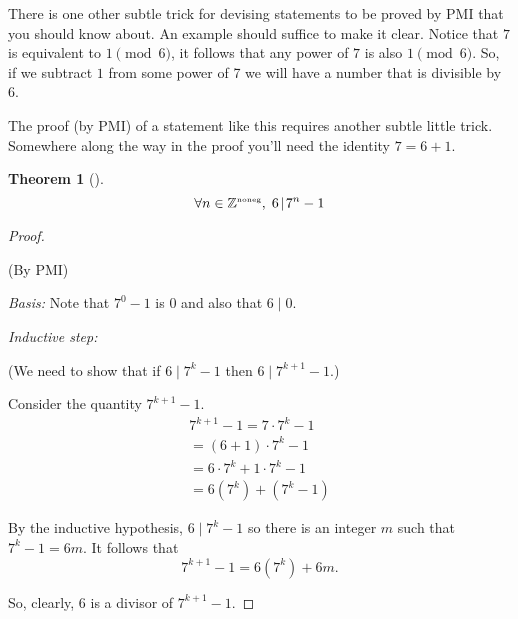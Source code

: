 \documentclass[10pt,]{book}
\theoremstyle{plain}
\newtheorem{theorem}{Theorem}[section]
\theoremstyle{definition}
\theoremstyle{definition}
\numberwithin{equation}{section}
\renewcommand{\Naturals}{{\mathbb Z}^{\mbox{\tiny noneg}} }
\newcommand{\divides}{\!\mid\!}
\newcommand{\Naturals}{{\mathbb N}}
\begin{document}
    There is one other subtle trick for devising statements to be
    proved by PMI that you should know about. An example should
    suffice to make it clear. Notice that \(7\) is equivalent to \(1 \pmod{6}\),
    it follows that any power of \(7\) is also \(1 \pmod{6}\). So, if we subtract
    \(1\) from some power of 7 we will have a number that is divisible by \(6\).
\par

    The proof (by PMI) of a statement like this requires another subtle little
    trick. Somewhere along the way in the proof you'll need the identity \(7=6+1\).
\begin{theorem}[{}]\label{theorem-23}
\begin{equation*}
        \forall n \in \Naturals, \; 6 \divides 7^n-1
      \end{equation*}\end{theorem}
\begin{proof}\hypertarget{proof-35}{}

      (By PMI)
\par

      \emph{Basis:} Note that \(7^0-1\) is \(0\) and also that \(6 \divides 0\).
\par

      \emph{Inductive step:}
\par

      (We need to show that if \(6 \divides 7^k-1\) then \(6 \divides 7^{k+1}-1\).)
\par

      Consider the quantity \(7^{k+1}-1\).
      \begin{gather*}
7^{k+1}-1 = 7 \cdot 7^k -1\\
= (6 + 1) \cdot 7^k - 1\\
= 6 \cdot 7^k + 1 \cdot 7^k - 1\\
= 6(7^k) + (7^k - 1)
\end{gather*}
\par

      By the inductive hypothesis, \(6 \divides 7^k - 1\) so there is
      an integer \(m\) such that \(7^k - 1 = 6m\). It follows that
      \begin{equation*}
        7^{k+1}-1 = 6(7^k) + 6m.
      \end{equation*}
\par

      So, clearly, \(6\) is a divisor of \(7^{k+1}-1\).
\end{proof}
\par
\end{document}
